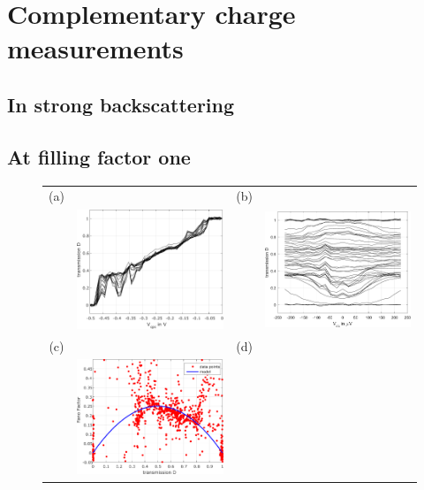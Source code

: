 \chapter{Complementary charge measurements}


\section{In strong backscattering}

\section{At filling factor one}

\begin{figure}[hptb]
	\begin{center}
		\begin{tabular}{c c c c}
			(a) & & (b) & \\
			& \includegraphics[width = 6.5 cm]{./appE/nu_1_D_vs_Vqpc_for_several_Vdc} &
			& \includegraphics[width = 6.5 cm]{./appE/nu_1_D_vs_Vdc_for_several_Vqpc} \\
			(c) & & (d) & \\
			& \includegraphics[width = 6.5 cm]{./appE/nu_1_noise_vs_D_for_several_Vdc} &

\end{tabular}
\end{center}
\end{figure}
